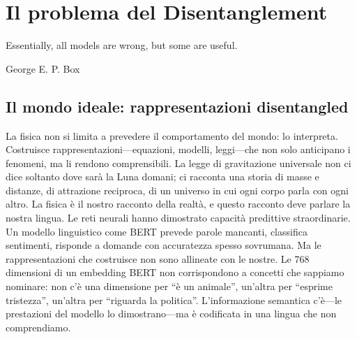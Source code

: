 \section{Il problema del Disentanglement}
\label{sec:04_disentangling_dense_embeddings_with_sparse_autoencoders}

\epigraph{
    Essentially, all models are wrong, but some are useful.
}{George E. P. Box}

\newpage

\subsection{Il mondo ideale: rappresentazioni disentangled}
\label{subsec:mondo_ideale}
La fisica non si limita a prevedere il comportamento del mondo: lo interpreta. Costruisce rappresentazioni—equazioni, modelli, leggi—che non solo anticipano i fenomeni, ma li rendono comprensibili. La legge di gravitazione universale non ci dice soltanto dove sarà la Luna domani; ci racconta una storia di masse e distanze, di attrazione reciproca, di un universo in cui ogni corpo parla con ogni altro. La fisica è il nostro racconto della realtà, e questo racconto deve parlare la nostra lingua.
Le reti neurali hanno dimostrato capacità predittive straordinarie. Un modello linguistico come BERT prevede parole mancanti, classifica sentimenti, risponde a domande con accuratezza spesso sovrumana. Ma le rappresentazioni che costruisce non sono allineate con le nostre. Le 768 dimensioni di un embedding BERT non corrispondono a concetti che sappiamo nominare: non c'è una dimensione per ``è un animale'', un'altra per ``esprime tristezza'', un'altra per ``riguarda la politica''. L'informazione semantica c'è—le prestazioni del modello lo dimostrano—ma è codificata in una lingua che non comprendiamo.
